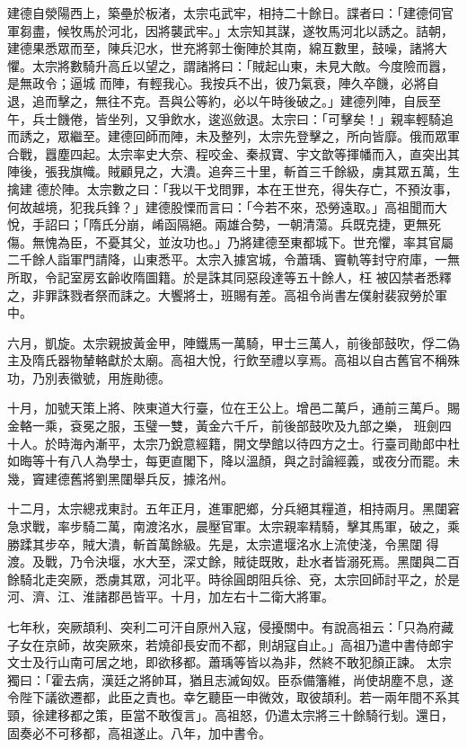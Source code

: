 \begin{pinyinscope}
 建德自滎陽西上，築壘於板渚，太宗屯武牢，相持二十餘日。諜者曰：「建德伺官軍芻盡，候牧馬於河北，因將襲武牢。」太宗知其謀，遂牧馬河北以誘之。詰朝，建德果悉眾而至，陳兵氾水，世充將郭士衡陣於其南，綿互數里，鼓噪，諸將大懼。太宗將數騎升高丘以望之，謂諸將曰：「賊起山東，未見大敵。今度險而囂，是無政令；逼城
 而陣，有輕我心。我按兵不出，彼乃氣衰，陣久卒饑，必將自退，追而擊之，無往不克。吾與公等約，必以午時後破之。」建德列陣，自辰至午，兵士饑倦，皆坐列，又爭飲水，逡巡斂退。太宗曰：「可擊矣！」親率輕騎追而誘之，眾繼至。建德回師而陣，未及整列，太宗先登擊之，所向皆靡。俄而眾軍合戰，囂塵四起。太宗率史大奈、程咬金、秦叔寶、宇文歆等揮幡而入，直突出其陣後，張我旗幟。賊顧見之，大潰。追奔三十里，斬首三千餘級，虜其眾五萬，生擒建
 德於陣。太宗數之曰：「我以干戈問罪，本在王世充，得失存亡，不預汝事，何故越境，犯我兵鋒？」建德股慄而言曰：「今若不來，恐勞遠取。」高祖聞而大悅，手詔曰；「隋氏分崩，崤函隔絕。兩雄合勢，一朝清蕩。兵既克捷，更無死傷。無愧為臣，不憂其父，並汝功也。」乃將建德至東都城下。世充懼，率其官屬二千餘人詣軍門請降，山東悉平。太宗入據宮城，令蕭瑀、竇軌等封守府庫，一無所取，令記室房玄齡收隋圖籍。於是誅其同惡段達等五十餘人，枉
 被囚禁者悉釋之，非罪誅戮者祭而誄之。大饗將士，班賜有差。高祖令尚書左僕射裴寂勞於軍中。



 六月，凱旋。太宗親披黃金甲，陣鐵馬一萬騎，甲士三萬人，前後部鼓吹，俘二偽主及隋氏器物輦輅獻於太廟。高祖大悅，行飲至禮以享焉。高祖以自古舊官不稱殊功，乃別表徽號，用旌勛德。



 十月，加號天策上將、陜東道大行臺，位在王公上。增邑二萬戶，通前三萬戶。賜金輅一乘，袞冕之服，玉璧一雙，黃金六千斤，前後部鼓吹及九部之樂，
 班劍四十人。於時海內漸平，太宗乃銳意經籍，開文學館以待四方之士。行臺司勛郎中杜如晦等十有八人為學士，每更直閣下，降以溫顏，與之討論經義，或夜分而罷。未幾，竇建德舊將劉黑闥舉兵反，據洺州。



 十二月，太宗總戎東討。五年正月，進軍肥鄉，分兵絕其糧道，相持兩月。黑闥窘急求戰，率步騎二萬，南渡洺水，晨壓官軍。太宗親率精騎，擊其馬軍，破之，乘勝蹂其步卒，賊大潰，斬首萬餘級。先是，太宗遣堰洺水上流使淺，令黑闥
 得渡。及戰，乃令決堰，水大至，深丈餘，賊徒既敗，赴水者皆溺死焉。黑闥與二百餘騎北走突厥，悉虜其眾，河北平。時徐圓朗阻兵徐、兗，太宗回師討平之，於是河、濟、江、淮諸郡邑皆平。十月，加左右十二衛大將軍。



 七年秋，突厥頡利、突利二可汗自原州入寇，侵擾關中。有說高祖云：「只為府藏子女在京師，故突厥來，若燒卻長安而不都，則胡寇自止。」高祖乃遣中書侍郎宇文士及行山南可居之地，即欲移都。蕭瑀等皆以為非，然終不敢犯顏正諫。
 太宗獨曰：「霍去病，漢廷之將帥耳，猶且志滅匈奴。臣忝備籓維，尚使胡塵不息，遂令陛下議欲遷都，此臣之責也。幸乞聽臣一申微效，取彼頡利。若一兩年間不系其頸，徐建移都之策，臣當不敢復言」。高祖怒，仍遣太宗將三十餘騎行刬。還日，固奏必不可移都，高祖遂止。八年，加中書令。




\end{pinyinscope}
